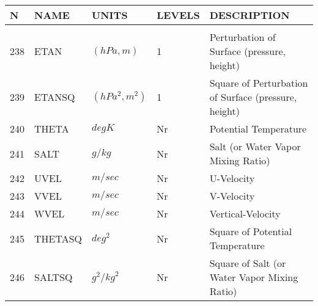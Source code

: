 \newpage
\vspace*{\fill}
\begin{tabular}{lllll}
\hline\hline
N & NAME & UNITS & LEVELS & DESCRIPTION \\
\hline

&\\
238& ETAN     & $(hPa,m)$ &    1
         &\begin{minipage}[t]{3in}
          {Perturbation of Surface (pressure, height)} 
         \end{minipage}\\
239& ETANSQ   & $(hPa^2,m^2)$ & 1
         &\begin{minipage}[t]{3in}
          {Square of Perturbation of Surface (pressure, height)} 
         \end{minipage}\\
240& THETA    & $deg K$ & Nr
         &\begin{minipage}[t]{3in}
          {Potential Temperature} 
         \end{minipage}\\
241& SALT     & $g/kg$ & Nr
         &\begin{minipage}[t]{3in}
          {Salt (or Water Vapor Mixing Ratio)} 
         \end{minipage}\\
242& UVEL     & $m/sec$ & Nr
         &\begin{minipage}[t]{3in}
          {U-Velocity} 
         \end{minipage}\\
243& VVEL     & $m/sec$ & Nr
         &\begin{minipage}[t]{3in}
          {V-Velocity} 
         \end{minipage}\\
244& WVEL     & $m/sec$ & Nr
         &\begin{minipage}[t]{3in}
          {Vertical-Velocity} 
         \end{minipage}\\
245& THETASQ  & $deg^2$ & Nr
         &\begin{minipage}[t]{3in}
          {Square of Potential Temperature} 
         \end{minipage}\\
246& SALTSQ   & $g^2/{kg}^2$ & Nr
         &\begin{minipage}[t]{3in}
          {Square of Salt (or Water Vapor Mixing Ratio)} 
         \end{minipage}\\

\end{tabular}

